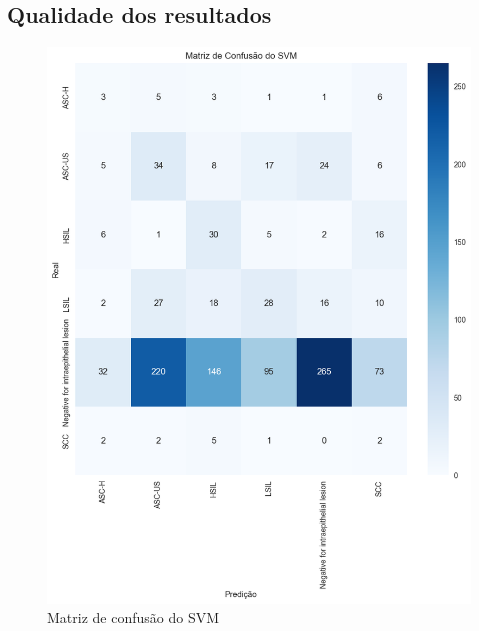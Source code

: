 \documentclass[12pt]{article}
\begin{document}
\subsection{Qualidade dos resultados}

\begin{figure}
    \centering
    \includegraphics[width=\textwidth]{Matriz confusao SVM.png}
    \caption{Matriz de confusão do SVM}
    \label{fig:matriz-confusao-svm}
\end{figure}
\end{document}
